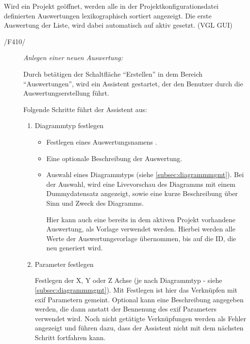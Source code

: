 	Wird ein Projekt geöffnet, werden alle in der Projektkonfigurationsdatei definierten Auswertungen lexikographisch sortiert angezeigt. Die erste Auswertung der Liste, wird dabei automatisch auf aktiv gesetzt. (VGL GUI)

	\begin{description}
		
		\item[/F410/] \textit{Anlegen einer neuen Auswertung:}\par Durch betätigen der Schaltfläche "`Erstellen"' in dem Bereich "`Auswertungen"', wird ein Assistent gestartet, der den Benutzer durch die Auswertungserstellung führt.\par Folgende Schritte führt der Assistent aus:

			\begin{enumerate}

				\item Diagrammtyp festlegen

					\begin{itemize}

						\item Festlegen eines Auswertungsnamens .

						\item Eine optionale Beschreibung der Auswertung.

						\item Auswahl eines Diagrammtyps (siehe \ref{subsec:diagrammmgmt}). Bei der Auswahl, wird eine Livevorschau des Diagramms mit einem Dummydatensatz angezeigt, sowie eine kurze Beschreibung über Sinn und Zweck des Diagramms.\par Hier kann auch eine bereits in dem aktiven Projekt vorhandene Auswertung, als Vorlage verwendet werden. Hierbei werden alle Werte der Auswertungsvorlage übernommen, bis auf die ID, die neu generiert wird.

					\end{itemize}

				\item Parameter festlegen\par	Festlegen der X, Y oder Z Achse (je nach Diagrammtyp - siehe \ref{subsec:diagrammmgmt}). Mit Festlegen ist hier das Verknüpfen mit \gls{exif} Parametern gemeint. Optional kann eine Beschreibung angegeben werden, die dann anstatt der Bennenung des \gls{exif} Parameters verwendet wird. Noch nicht getätigte Verknüpfungen werden als Fehler angezeigt und führen dazu, dass der Assistent nicht mit dem nächsten Schritt fortfahren kann.


\end{enumerate}
\end{description}
